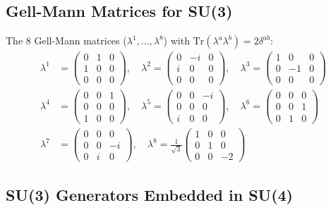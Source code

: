 \documentclass[11pt,a4paper]{article}
\theoremstyle{definition}
\begin{document}
\subsection{Gell-Mann Matrices for SU(3)}
\label{subsec:gellmann}

The 8 Gell-Mann matrices ($\lambda^1, \ldots, \lambda^8$) with $\text{Tr}(\lambda^a \lambda^b) = 2\delta^{ab}$:
\begin{align}
  \label{eq:gellmann-1-3}
  \lambda^1 &= \begin{pmatrix} 0&1&0\\1&0&0\\0&0&0 \end{pmatrix}, \quad
  \lambda^2 = \begin{pmatrix} 0&-i&0\\i&0&0\\0&0&0 \end{pmatrix}, \quad
  \lambda^3 = \begin{pmatrix} 1&0&0\\0&-1&0\\0&0&0 \end{pmatrix} \\
  \label{eq:gellmann-4-6}
  \lambda^4 &= \begin{pmatrix} 0&0&1\\0&0&0\\1&0&0 \end{pmatrix}, \quad
  \lambda^5 = \begin{pmatrix} 0&0&-i\\0&0&0\\i&0&0 \end{pmatrix}, \quad
  \lambda^6 = \begin{pmatrix} 0&0&0\\0&0&1\\0&1&0 \end{pmatrix} \\
  \label{eq:gellmann-7-8}
  \lambda^7 &= \begin{pmatrix} 0&0&0\\0&0&-i\\0&i&0 \end{pmatrix}, \quad
  \lambda^8 = \frac{1}{\sqrt{3}}\begin{pmatrix} 1&0&0\\0&1&0\\0&0&-2 \end{pmatrix}
\end{align}

\subsection{SU(3) Generators Embedded in SU(4)}
\label{subsec:su3-in-su4}
\end{document}
